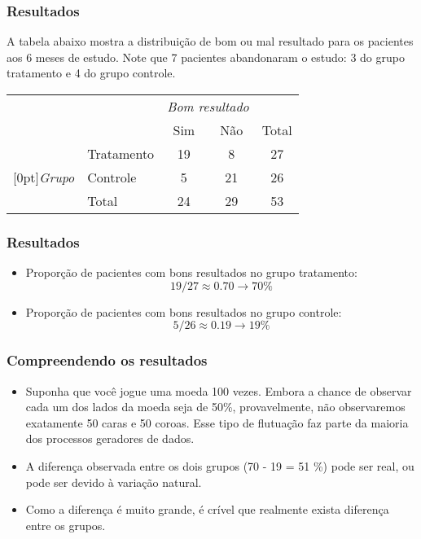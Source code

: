 
\begin{frame}
\frametitle{Resultados}
\justifying
A tabela abaixo mostra a distribuição de bom ou mal resultado para os pacientes aos 6 meses de estudo. Note que 7 pacientes abandonaram o estudo: 3 do grupo tratamento e 4 do grupo controle.

\begin{center}
\begin{tabular}{ll  cc c} 
			&				& \multicolumn{2}{c}{\textit{Bom resultado}} \\
\cline{3-4}
			&							& Sim 	& Não 	& Total	\\
\cline{2-5}
							&Tratamento 	& 19	 	& 8		& 27 	\\
\raisebox{1.5ex}[0pt]{\textit{Grupo}}	&Controle		& 5	 	& 21	 	& 26 \\
\cline{2-5}
							&Total		& 24		& 29		& 53
\end{tabular}
\end{center}

\end{frame}

\begin{frame}
\frametitle{Resultados}
\begin{itemize}

\item Proporção de pacientes com bons resultados no grupo tratamento:
\[ 19/27 \approx 0.70 \rightarrow 70\% \]

\pause

\item Proporção de pacientes com bons resultados no grupo controle:
\[ 5 / 26 \approx 0.19 \rightarrow 19\% \]

\end{itemize}

\end{frame}


\begin{frame}
\frametitle{Compreendendo os resultados}


\pause

\begin{itemize}
\justifying
\item Suponha que você jogue uma moeda 100 vezes. Embora a chance de observar cada um dos lados da moeda seja de 50\%, provavelmente, não observaremos exatamente 50 caras e 50 coroas. Esse tipo de flutuação faz parte da maioria dos processos geradores de dados.

\justifying
\item A diferença observada entre os dois grupos (70 - 19 = 51 \%) pode ser real, ou pode ser devido à variação natural.

\justifying
\item Como a diferença é muito grande, é crível que realmente exista diferença entre os grupos.
\end{itemize}

\end{frame}


